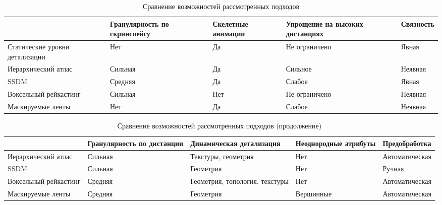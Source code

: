 \begin{table}[ht]
\small
\centering
\begin{tabular}{| p{24mm} | p{26mm} | p{18mm} | p{20mm} | p{16mm} |}
\hline
                       & Гранулярность по скринспейсу & Скелетные анимации & Упрощение на высоких дистанциях & Связность \\
\hline
Статические уровни детализации & Нет                          & Да                 & Не ограничено            & Явная     \\
\hline
Иерархический атлас    & Сильная                      & Да                 & Сильное                  & Неявная   \\
\hline
SSDM                   & Средняя                      & Да                 & Слабое                   & Явная     \\
\hline
Воксельный рейкастинг  & Сильная                      & Нет                & Не ограничено            & Неявная   \\
\hline
Маскируемые ленты      & Нет                          & Да                 & Слабое                   & Неявная   \\
\hline
\end{tabular}
\caption{Сравнение возможностей рассмотренных подходов}
\end{table}

\begin{table}[ht]
\small
\centering
\begin{tabular}{ p{24mm} | p{24mm} | p{24mm} | p{24mm} | p{24mm} }
                      & Гранулярность по дистанции & Динамическая детализация
                      & Неоднородные атрибуты & Предобработка \\
\hline
Иерархический атлас   & Сильная & Текстуры, геометрия            & Нет & Автоматическая \\
\hline
SSDM                  & Сильная & Геометрия                      & Нет & Ручная \\
\hline
Воксельный рейкастинг & Средняя & Геометрия, топология, текстуры & Нет & Автоматическая \\
\hline
Маскируемые ленты     & Средняя & Геометрия                      & Вершинные & Автоматическая \\
\end{tabular}
\caption{Сравнение возможностей рассмотренных подходов (продолжение)}
\end{table}
